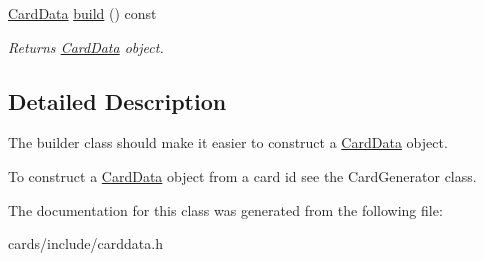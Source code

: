 \begin{DoxyCompactItemize}
\mbox{\label{classl5r_1_1CardData_1_1builder_a048a99aa0a0fb225886c28a30f3ca275}} 
\hyperlink{classl5r_1_1CardData}{Card\+Data} \hyperlink{classl5r_1_1CardData_1_1builder_a048a99aa0a0fb225886c28a30f3ca275}{build} () const
\begin{DoxyCompactList}\small\item\em Returns \hyperlink{classl5r_1_1CardData}{Card\+Data} object. \end{DoxyCompactList}\end{DoxyCompactItemize}


\subsection{Detailed Description}
The builder class should make it easier to construct a \hyperlink{classl5r_1_1CardData}{Card\+Data} object. 

To construct a \hyperlink{classl5r_1_1CardData}{Card\+Data} object from a card id see the Card\+Generator class. 

The documentation for this class was generated from the following file\+:\begin{DoxyCompactItemize}
\item 
cards/include/carddata.\+h\end{DoxyCompactItemize}
